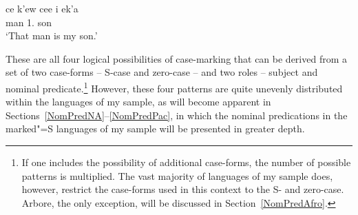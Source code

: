 \begin{exe}\ex \label{Wappo}
\gll ce k'ew ce{\textglotstop}e{\textglotstop} i ek'a\\
     \dem{} man \cop{} 1.\sg{} son\\
	\glt	`That man is my son.'
\end{exe}                                                                                                  

\noindent These are all four logical possibilities of case-marking that can be derived from a set of two case-forms -- S-case and zero-case -- and two roles -- subject and nominal predicate.\footnote{If one includes the possibility of additional case-forms, the number of possible patterns is multiplied. 
The vast majority  of languages of my sample does, however, restrict the case-forms used in this context to the S- and zero-case. 
Arbore, the only exception, will be discussed in Section~\ref{NomPredAfro}.}
However, these four patterns are quite unevenly distributed within the languages of my sample, as will become apparent in Sections~\ref{NomPredNA}--\ref{NomPredPac}, in which the nominal predications in the marked"=S languages of my sample will be presented in greater depth.

